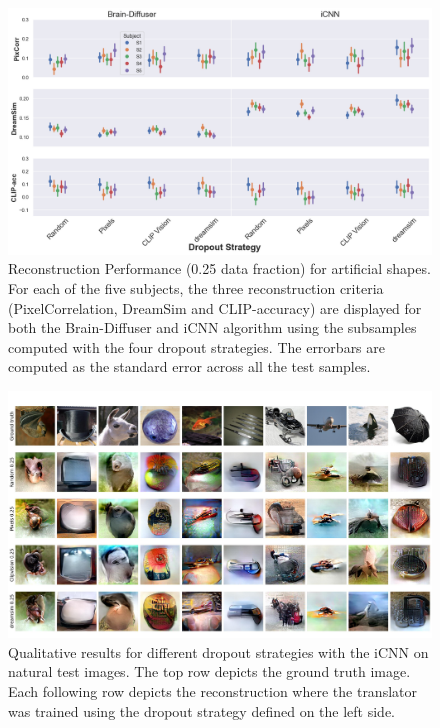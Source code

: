 \begin{figure}[ht]
  \centering
  \includegraphics[width=1\textwidth]{plots/dropout_eval_reconstruction_art.png}
  \caption[Experiment 1: Reconstruction performance for artificial shapes]{Reconstruction Performance (0.25 data fraction) for artificial shapes. For each of the five subjects, the three reconstruction criteria (PixelCorrelation, DreamSim and CLIP-accuracy) are displayed for both the Brain-Diffuser and iCNN algorithm using the subsamples computed with the four dropout strategies. The errorbars are computed as the standard error across all the test samples.}\label{fig:dropout_eval_reconstruction_art}
\end{figure}


\begin{figure}[ht]
  \centering
  \includegraphics[width=1\textwidth]{plots/dropout_qual_eval_icnn_test.JPEG}
  \caption[Experiment 1: Reconstructed images for iCNN on natural test images]{Qualitative results for different dropout strategies with the iCNN on natural test images. The top row depicts the ground truth image. Each following row depicts the reconstruction where the translator was trained using the dropout strategy defined on the left side.}\label{fig:dropout_qual_eval_icnn_test}
\end{figure}

